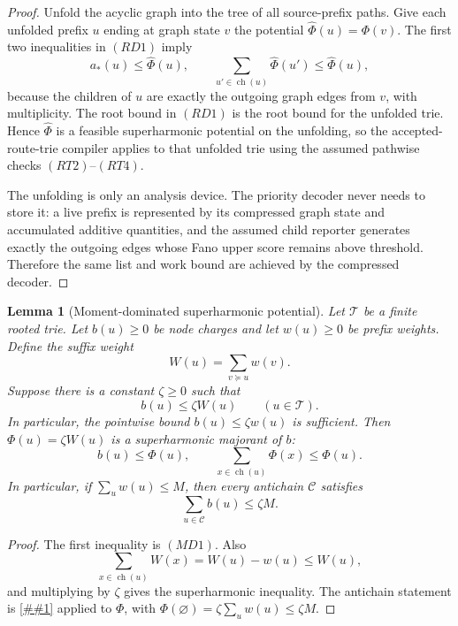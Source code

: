 \documentclass[10pt]{article}
\newcommand{\cref}[1]{\ref{##1}}
\newtheorem{lemma}[theorem]{Lemma}
\theoremstyle{definition}
\begin{document}
\begin{proof}
   Unfold the acyclic graph into the tree of all source-prefix paths.  Give each
   unfolded prefix \(u\) ending at graph state \(v\) the potential
   \(\widehat\Phi(u)=\Phi(v)\).  The first two inequalities in \((RD1)\) imply
   \[
      a_*(u)\le\widehat\Phi(u),
      \qquad
      \sum_{u'\in\operatorname{ch}(u)}\widehat\Phi(u')
      \le\widehat\Phi(u),
   \]
   because the children of \(u\) are exactly the outgoing graph edges from
   \(v\), with multiplicity.  The root bound in \((RD1)\) is the root bound for
   the unfolded trie.  Hence \(\widehat\Phi\) is a feasible superharmonic
   potential on the unfolding, so the accepted-route-trie compiler applies to
   that unfolded trie using the assumed pathwise checks \((RT2)\)--\((RT4)\).

   The unfolding is only an analysis device.  The priority decoder never needs
   to store it: a live prefix is represented by its compressed graph state and
   accumulated additive quantities, and the assumed child reporter generates
   exactly the outgoing edges whose Fano upper score remains above threshold.
   Therefore the same list and work bound are achieved by the compressed
   decoder.
\end{proof}

\begin{lemma}[Moment-dominated superharmonic potential]
   \label{lem:moment-dominated-superharmonic}
   Let \(\mathcal T\) be a finite rooted trie.  Let \(b(u)\ge0\) be node
   charges and let \(w(u)\ge0\) be prefix weights.  Define the suffix weight
   \[
      W(u)=\sum_{v\succeq u}w(v).
   \]
   Suppose there is a constant \(\zeta\ge0\) such that
   \[
      b(u)\le \zeta W(u)
      \qquad(u\in\mathcal T).
      \tag{MD1}
   \]
   In particular, the pointwise bound \(b(u)\le\zeta w(u)\) is sufficient.
   Then \(\Phi(u)=\zeta W(u)\) is a superharmonic majorant of \(b\):
   \[
      b(u)\le\Phi(u),
      \qquad
      \sum_{x\in\operatorname{ch}(u)}\Phi(x)\le\Phi(u).
   \]
   In particular, if \(\sum_uw(u)\le M\), then every antichain
   \(\mathcal C\) satisfies
   \[
      \sum_{u\in\mathcal C}b(u)\le \zeta M .
   \]
\end{lemma}

\begin{proof}
   The first inequality is \((MD1)\).  Also
   \[
      \sum_{x\in\operatorname{ch}(u)}W(x)
      =
      W(u)-w(u)
      \le W(u),
   \]
   and multiplying by \(\zeta\) gives the superharmonic inequality.  The
   antichain statement is \cref{lem:local-antichain-charge-potential} applied
   to \(\Phi\), with \(\Phi(\varnothing)=\zeta\sum_uw(u)\le\zeta M\).
\end{proof}
\end{document}
